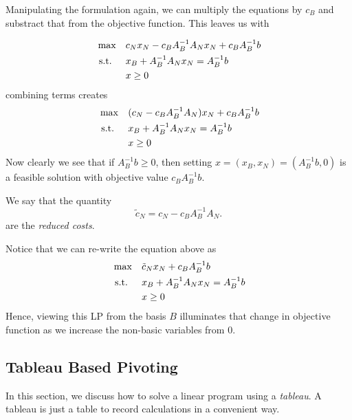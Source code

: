Manipulating the formulation again, we can multiply the equations by $c_B$ and substract that from the objective function.  This leaves us with

 \begin{equation}
\begin{split}
\max \quad & c_N x_N - c_B A_B^{-1} A_N x_N + c_B A_B^{-1} b  \\
\mbox{ s.t. }  \quad &x_B +  A_B^{-1} A_N x_N = A_B^{-1}b\\
& x \geq 0
\end{split}
\end{equation}
combining terms creates 
 \begin{equation}
 \label{LP:basis-solution}
\begin{split}
\max \quad & (c_N  - c_B A_B^{-1} A_N) x_N + c_B A_B^{-1} b  \\
\mbox{ s.t. }  \quad &x_B +  A_B^{-1} A_N x_N = A_B^{-1}b\\
& x \geq 0
\end{split}
\end{equation}
Now clearly we see that if $A_B^{-1}b \geq 0$, then setting $x = (x_B, x_N) = (A_B^{-1}b, 0)$ is a feasible solution with objective value $c_BA_B^{-1} b$.

We say that the quantity 
$$
\tilde c_N = c_N  - c_B A_B^{-1} A_N.
$$
are the \emph{reduced costs}.

Notice that we can re-write the equation above as 
 \begin{equation}
 \label{LP:basis-solution}
\begin{split}
\max \quad & \tilde c_N x_N + c_B A_B^{-1} b  \\
\mbox{ s.t. }  \quad &x_B +  A_B^{-1} A_N x_N = A_B^{-1}b\\
& x \geq 0
\end{split}
\end{equation}
Hence, viewing this LP from the basis $B$ illuminates that change in objective function as we increase the non-basic variables from $0$.



\subsection{Tableau Based Pivoting}
In this section, we discuss how to solve a linear program using a \emph{tableau}.  A tableau is just a table to record calculations in a convenient way.


\newcommand{\sss}[1]{\subsubsection*{#1}}
\newcommand{\cm}{\hspace{1cm}}
 \newtheorem*{prob7}{Theorem}
 \newtheorem*{prob8}{Proposition}
\renewcommand{\v}[1]{{\vec{x}_{#1}}^\text{*}}
\newcommand{\vy}{{\vec{y}}}
\newcommand{\ox}{\overline{x}}
\renewcommand{\c}{{\bf{c}}}
\renewcommand{\a}{{\bf{a}}}
\newcommand{\A}{{\bf{A}}}
\renewcommand{\O}{{\bf{0}}}



